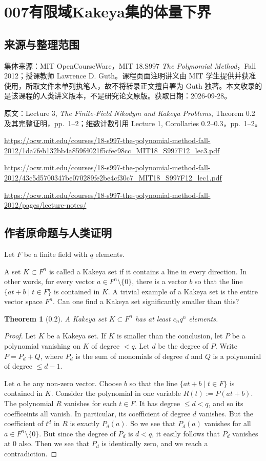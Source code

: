 \documentclass[UTF8,11pt]{ctexart}
\newtheorem*{theorem}{Theorem}
\begin{document}
\section*{007\quad 有限域Kakeya集的体量下界}
\subsection*{来源与整理范围}
集体来源：MIT OpenCourseWare，MIT 18.S997 \emph{The Polynomial Method}，Fall 2012；授课教师 Lawrence D. Guth。课程页面注明讲义由 MIT 学生提供并获准使用，所取文件未单列执笔人，故不将转录正文擅自署为 Guth 独著。本文收录的是该课程的人类讲义版本，不是研究论文原版。获取日期：2026-09-28。\par 原文：Lecture 3, \emph{The Finite-Field Nikodym and Kakeya Problems}, Theorem 0.2 及其完整证明，pp.~1--2；维数计数引用 Lecture 1, Corollaries 0.2--0.3，pp.~1--2。
\par\url{https://ocw.mit.edu/courses/18-s997-the-polynomial-method-fall-2012/1da7feb132bb4a859fd021f5cfec98cc_MIT18_S997F12_lec3.pdf}
\par\url{https://ocw.mit.edu/courses/18-s997-the-polynomial-method-fall-2012/43c5d5700347be070289fe2be4cf30c7_MIT18_S997F12_lec1.pdf}
\par\url{https://ocw.mit.edu/courses/18-s997-the-polynomial-method-fall-2012/pages/lecture-notes/}

\subsection*{作者原命题与人类证明}
Let $F$ be a finite field with $q$ elements.

A set $K\subset F^n$ is called a Kakeya set if it contains a line in every direction. In other words, for every vector $a\in F^n\setminus\{0\}$, there is a vector $b$ so that the line $\{at+b\mid t\in F\}$ is contained in $K$. A trivial example of a Kakeya set is the entire vector space $F^n$. Can one find a Kakeya set significantly smaller than this?

\begin{theorem}[0.2]
A Kakeya set $K\subset F^n$ has at least $c_nq^n$ elements.
\end{theorem}
\begin{proof}
Let $K$ be a Kakeya set. If $K$ is smaller than the conclusion, let $P$ be a polynomial vanishing on $K$ of degree $<q$. Let $d$ be the degree of $P$. Write $P=P_d+Q$, where $P_d$ is the sum of monomials of degree $d$ and $Q$ is a polynomial of degree $\leq d-1$.

Let $a$ be any non-zero vector. Choose $b$ so that the line $\{at+b\mid t\in F\}$ is contained in $K$. Consider the polynomial in one variable $R(t):=P(at+b)$. The polynomial $R$ vanishes for each $t\in F$. It has degree $\leq d<q$, and so its coefficeints all vanish. In particular, its coefficient of degree $d$ vanishes. But the coefficient of $t^d$ in $R$ is exactly $P_d(a)$. So we see that $P_d(a)$ vanishes for all $a\in F^n\setminus\{0\}$. But since the degree of $P_d$ is $d<q$, it easily follows that $P_d$ vanishes at $0$ also. Then we see that $P_d$ is identically zero, and we reach a contradiction.
\end{proof}
\end{document}
